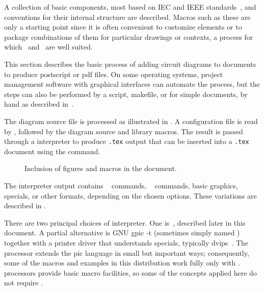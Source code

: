 A collection of basic components, most based on IEC and IEEE
standards~\cite{IECstd,IEEEstd},
and conventions for their internal
structure are described.  Macros such as these are only a starting
point since it is often convenient to customize elements or to package
combinations of them for particular drawings or contexts,
a process for which \Mfour\ and \pic\ are well suited.

This section describes the basic process of adding circuit diagrams to
\latex documents to produce postscript or pdf files.  On some operating
systems, project management software with graphical interfaces can
automate the process, but the steps can also be performed by a script,
makefile, or for simple documents, by hand as described in~.

The diagram source file is processed as illustrated in
.  A configuration file is read by \Mfour,
followed by the diagram source and library macros.
The result is passed through a
\pic interpreter to produce {\tt .tex} output that can be inserted
into a {\tt .tex} document using the \verb|| command.

\begin{figure}[ht]
 \caption{Inclusion of figures and macros in the \latex document.
 \label{Flowdiag}}
 \end{figure}

\noindent
The interpreter output contains
\TPGF~\cite{tikz} commands,
\PSTricks~\cite{pstricks} commands,
basic \latex graphics, 
\tpic specials, or other formats,
depending on the chosen options.
These variations are described in .

There are two principal choices of \pic interpreter.  One is~\dpic,
described later in this document.  A partial alternative is
GNU {\bq gpic -t} (sometimes simply named \pic)~\cite{gpic}
together with a printer driver
that understands \tpic specials, typically {\bq dvips}~\cite{dvips}.
The \dpic processor extends the pic language in small but important ways;
consequently, some of the macros and examples in this distribution work fully
only with \dpic.
\Pic processors provide basic macro facilities, so some of the
concepts applied here do not require \Mfour.

